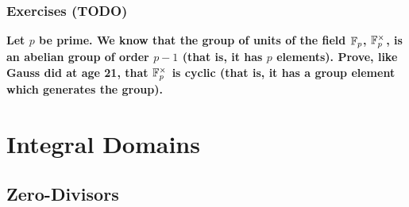 \documentclass{exam}
\begin{document}
\subsubsection{Exercises (TODO)}

\begin{questions}

\question \textbf{Let $p$ be prime. We know that the group of units of the field $\mathbb{F}_p$, $\mathbb{F}_p^\times$, is an abelian group of order $p-1$ (that is, it has $p$ elements). Prove, like Gauss did at age 21, that $\mathbb{F}_p^\times$ is cyclic (that is, it has a group element which generates the group).}

\end{questions}

\section{Integral Domains}

\subsection{Zero-Divisors}
\end{document}
